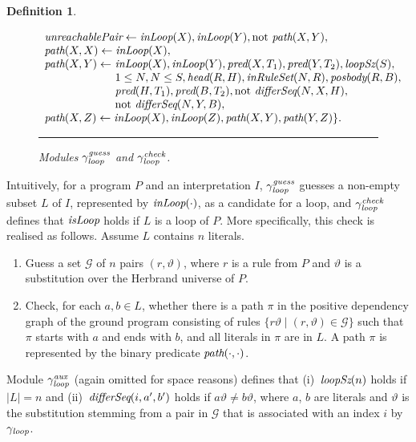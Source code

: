\documentclass{tlp}
\newcommand{\naf}{\mathrm{not}}
\newcommand{\subst}{\vartheta}
\newcommand{\Loop}{\mathit{LOOP}} \newcommand{\LoopGuess}{\mathit{LOOP_{guess}}} \newcommand{\LoopCheck}{\mathit{LOOP_{check}}} \newcommand{\LoopAux}{\mathit{LOOP_{aux}}} \renewcommand{\Loop}{\gamma_\mathit{loop}} \renewcommand{\LoopGuess}{\Loop^\mathit{guess}} \renewcommand{\LoopCheck}{\Loop^\mathit{check}} \renewcommand{\LoopAux}{\Loop^\mathit{aux}}
\renewcommand{\mathit}[1]{{\text{\it{#1}}}}
\newtheorem{definition}{Definition}
\begin{document}
\begin{definition}
\begin{figure}[t]
\begin{small}
$$\begin{array}{r@{}l}
&\mathit{unreachablePair} \leftarrow \mathit{inLoop}(X), \mathit{inLoop}(Y),  \naf\ \mathit{path}(X,Y), \\ 
&\mathit{path}(X,X) \leftarrow \mathit{inLoop}(X),   \\ 
&\begin{array}[t]{@{}l@{}l}
\mathit{path}(X,Y) \leftarrow\ & \mathit{inLoop}(X), \mathit{inLoop}(Y), \mathit{pred}(X,T_{1}), \mathit{pred}(Y,T_{2}),
       	       \mathit{loopSz}(S), \\& 1 \leq N, N \leq S, 
	       \mathit{head}(R,H),\mathit{inRuleSet}(N,R), 
	         \mathit{posbody}(R,B), \\&\mathit{pred}(H,T_{1}), \mathit{pred}(B,T_{2}),  
	          \naf\ \mathit{differSeq}(N,X,H), \\& \naf\ \mathit{differSeq}(N,Y,B),
\end{array}\\
&\mathit{path}(X,Z) \leftarrow \mathit{inLoop}(X), \mathit{inLoop}(Z), \mathit{path}(X,Y), \mathit{path}(Y,Z) \}\mbox{.}
\end{array}$$
\hrule
\end{small}
\caption{Modules $\LoopGuess$ and  $\LoopCheck$\label{fig:LOOP}.}
\end{figure}
\end{definition}


Intuitively, for a program $P$ and an interpretation $I$,
$\LoopGuess$  guesses  a non-empty subset $L$ of $I$, represented by  $\mathit{inLoop}(\cdot)$, 
as  a candidate for a loop, and
$\LoopCheck$ defines that $\mathit{isLoop}$ holds if $L$ is a loop of $P$.
More specifically, this check is realised as follows.
Assume $L$ contains $n$ literals.


\begin{enumerate}
\item Guess a set $\mathcal{G}$ of $n$ pairs $(r, \subst)$, where $r$ is a rule from $P$ and $\subst$ is a substitution over the Herbrand universe of $P$.

\item Check, for each $a,b \in L$, whether there is a path $\pi$ 
in the positive dependency graph of the ground program consisting of rules 
$\{r\subst \mid (r, \subst) \in \mathcal{G}\}$ such that
$\pi$ starts with  $a$ and ends with $b$, and
all literals in $\pi$ are in $L$. 
A path $\pi$ is represented by the binary  predicate $\mathit{path}(\cdot,\cdot)$.
\end{enumerate}

Module $\LoopAux$ (again omitted for space reasons) defines that (i)~$\mathit{loopSz}(n)$ holds if $|L| = n$ and (ii)~$\mathit{differSeq}(i,a',b')$ holds  if $a\subst \neq b\subst$, where  $a$, $b$ are literals and
$\subst$ is the substitution stemming from a pair in $\mathcal{G}$ that is associated with an index $i$ by $\Loop$.
\end{document}

